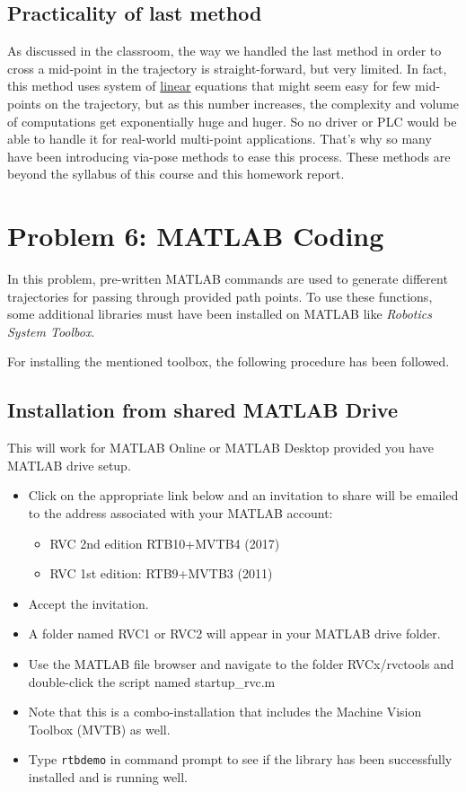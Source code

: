 \documentclass[conference]{IEEEtran}
\begin{document}
\subsection{Practicality of last method}
As discussed in the classroom, the way we handled the last method in order to cross a mid-point in the trajectory is straight-forward, but very limited. In fact, this method uses system of \underline{linear} equations that might seem easy for few mid-points on the trajectory, but as this number increases, the complexity and volume of computations get exponentially huge and huger. So no driver or PLC would be able to handle it for real-world multi-point applications. That's why so many have been introducing via-pose methods to ease this process. These methods are beyond the syllabus of this course and this homework report.



\section{Problem 6: MATLAB Coding}
In this problem, pre-written MATLAB commands are used to generate different trajectories for passing through provided path points. To use these functions, some additional libraries must have been installed on MATLAB like \textit{Robotics System Toolbox}. \cite{b10}

For installing the mentioned toolbox, the following procedure has been followed.
\subsection{Installation from shared MATLAB Drive}
This will work for MATLAB Online or MATLAB Desktop provided you have MATLAB drive setup.

\begin{itemize}
    \item Click on the appropriate link below and an invitation to share will be emailed to the address associated with your MATLAB account:\begin{itemize}
              \item RVC 2nd edition RTB10+MVTB4 (2017)
              \item RVC 1st edition: RTB9+MVTB3 (2011)
          \end{itemize}
    \item Accept the invitation.
    \item A folder named RVC1 or RVC2 will appear in your MATLAB drive folder.
    \item Use the MATLAB file browser and navigate to the folder RVCx/rvctools and double-click the script named startup\_rvc.m
    \item Note that this is a combo-installation that includes the Machine Vision Toolbox (MVTB) as well.
    \item Type \texttt{rtbdemo} in command prompt to see if the library has been successfully installed and is running well. \cite{b11}
\end{itemize}
\end{document}
